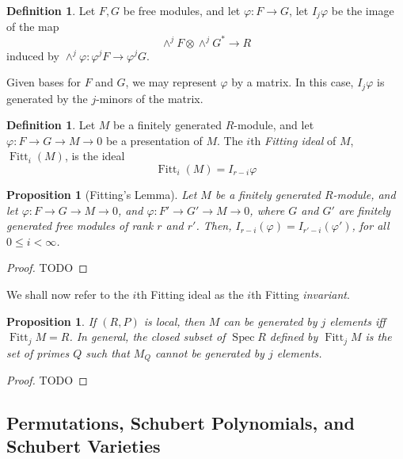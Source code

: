 \documentclass{amsart}
\newtheorem{proposition}[theorem]{Proposition}
\theoremstyle{definition}
\newtheorem{definition}[theorem]{Definition}
\theoremstyle{remark}
\DeclareMathOperator{\Spec}{Spec}
\DeclareMathOperator{\Fitt}{Fitt}
\numberwithin{equation}{section}
\begin{document}
\begin{definition}
  Let $F, G$ be free modules, and let $\varphi: F \to G$, let $I_j\varphi$ be the image of the map
  \begin{equation*}
    \wedge^j F \otimes \wedge^j G^* \to R
  \end{equation*}
  induced by $\wedge^j \varphi: \varphi^j F \to \varphi^j G$. 
\end{definition}

Given bases for $F$ and $G$, we may represent $\varphi$ by a matrix. In this case, $I_j \varphi$ is generated by the $j$-minors of the matrix. 

\begin{definition}
  Let $M$ be a finitely generated $R$-module, and let $\varphi: F \to G \to M \to 0$ be a presentation of $M$. The $i$th \emph{Fitting ideal} of $M$, $\Fitt_i(M)$, is the ideal
  \begin{equation*}
    \Fitt_i(M) = I_{r-i}\varphi
  \end{equation*}
\end{definition}

\begin{proposition}[Fitting's Lemma]
  Let $M$ be a finitely generated $R$-module, and let $\varphi: F \to G \to M \to 0$, and $\varphi: F' \to G' \to M \to 0$, where $G$ and $G'$ are finitely generated free modules of rank $r$ and $r'$. Then, $I_{r-i}(\varphi) = I_{r'-i}(\varphi')$,
  for all $0 \leq i < \infty$.
\end{proposition}

\begin{proof}
  TODO
\end{proof}

We shall now refer to the $i$th Fitting ideal as the $i$th Fitting \emph{invariant}.

\begin{proposition}
  If $(R, P)$ is local, then $M$ can be generated by $j$ elements iff $\Fitt_j M = R$. In general, the closed subset of $\Spec R$ defined by $\Fitt_j M$ is the set of primes $Q$ such that $M_Q$ cannot be generated by $j$ elements.
\end{proposition}

\begin{proof}
  TODO
\end{proof}

\subsection{Permutations, Schubert Polynomials, and Schubert Varieties}
\end{document}
